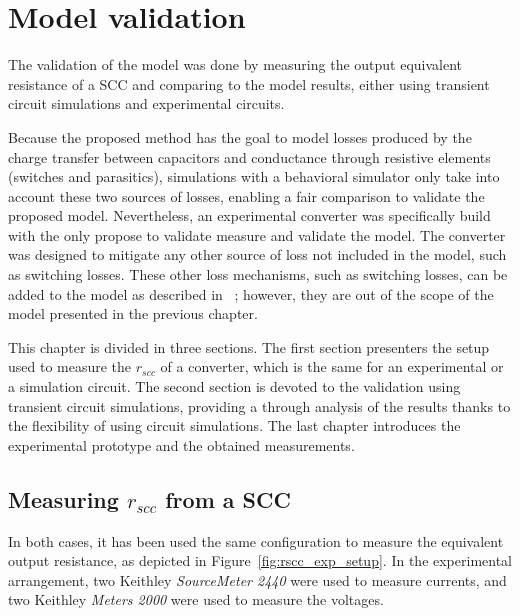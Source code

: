 \chapter{Model validation}
The validation of the model was done by measuring the output equivalent resistance of a SCC and comparing to the model results, either using transient circuit simulations and experimental circuits. 

Because the proposed method has the goal to model losses produced by the charge transfer between capacitors and conductance through resistive elements (switches and parasitics), simulations with a behavioral simulator only take into account these two sources of losses, enabling a fair comparison to validate the proposed model.  Nevertheless, an experimental converter was specifically build with the only propose to validate measure and validate the model. The converter was designed to mitigate any other source of loss not included in the model, such as switching losses. These other loss mechanisms, such as switching losses, can be added to the model as described in ~\cite{Seeman:EECS-2009-78}; however, they are out of the scope of the model presented in the previous chapter.

This chapter is divided in three sections. The first section presenters the setup used to measure the $r_{scc}$ of a converter, which is the same for an experimental or a simulation circuit. The second section is devoted to the validation using transient circuit simulations, providing a through analysis of the results thanks to the flexibility of using circuit simulations. The last chapter introduces the experimental prototype and the obtained measurements.


\section{Measuring $r_{scc}$ from a SCC}
In both cases, it has been used the same configuration to measure the equivalent output resistance, as depicted in Figure~\ref{fig:rscc_exp_setup}. In the experimental arrangement, two Keithley\textsuperscript{\textregistered} \emph{SourceMeter 2440} were used to measure currents, and two Keithley\textsuperscript{\textregistered} \emph{Meters 2000} were used to measure the voltages.

